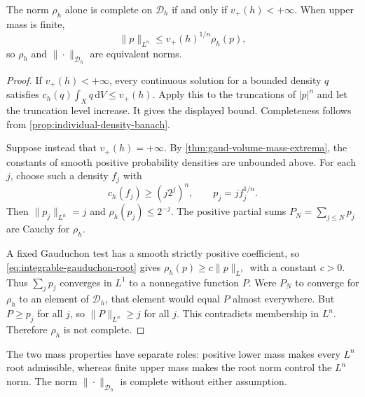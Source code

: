 \begin{proposition}\label{prop:individual-root-completeness}
The norm $\rho_h$ alone is complete on $\mathcal D_h$ if and only if $v_+(h)<+\infty$. When upper mass is finite,
\[
 \|p\|_{L^n}\leq v_+(h)^{1/n}\rho_h(p),
\]
so $\rho_h$ and $\|\cdot\|_{\mathcal D_h}$ are equivalent norms.
\end{proposition}
\begin{proof}
If $v_+(h)<+\infty$, every continuous solution for a bounded density $q$ satisfies
$c_h(q)\int_Xq\,\mathrm{d}V\leq v_+(h)$. Apply this to the truncations of $|p|^n$ and let the truncation level increase. It gives the displayed bound. Completeness follows from \cref{prop:individual-density-banach}.

Suppose instead that $v_+(h)=+\infty$. By \cref{thm:gaud-volume-mass-extrema}, the constants of smooth positive probability densities are unbounded above. For each $j$, choose such a density $f_j$ with
\[
 c_h(f_j)\geq(j2^j)^n,
 \qquad p_j=jf_j^{1/n}.
\]
Then $\|p_j\|_{L^n}=j$ and $\rho_h(p_j)\leq2^{-j}$. The positive partial sums $P_N=\sum_{j\leq N}p_j$ are Cauchy for $\rho_h$.

A fixed Gauduchon test has a smooth strictly positive coefficient, so \eqref{eq:integrable-gauduchon-root} gives $\rho_h(p)\geq c\|p\|_{L^1}$ with a constant $c>0$. Thus $\sum_jp_j$ converges in $L^1$ to a nonnegative function $P$. Were $P_N$ to converge for $\rho_h$ to an element of $\mathcal D_h$, that element would equal $P$ almost everywhere. But $P\geq p_j$ for all $j$, so $\|P\|_{L^n}\geq j$ for all $j$. This contradicts membership in $L^n$. Therefore $\rho_h$ is not complete.
\end{proof}

The two mass properties have separate roles: positive lower mass makes every $L^n$ root admissible, whereas finite upper mass makes the root norm control the $L^n$ norm. The norm $\|\cdot\|_{\mathcal D_h}$ is complete without either assumption.
